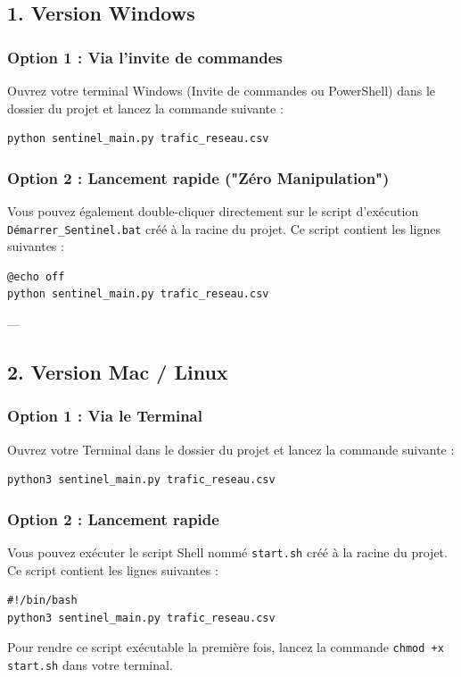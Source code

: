 \documentclass[a4paper, 12pt, twoside]{article}
\begin{document}
\subsection*{1. Version Windows}

\subsubsection*{Option 1 : Via l'invite de commandes}
Ouvrez votre terminal Windows (Invite de commandes ou PowerShell) dans le dossier du projet et lancez la commande suivante :
\begin{verbatim}
python sentinel_main.py trafic_reseau.csv
\end{verbatim}

\subsubsection*{Option 2 : Lancement rapide ("Zéro Manipulation")}
Vous pouvez également double-cliquer directement sur le script d'exécution \texttt{Démarrer\_Sentinel.bat} créé à la racine du projet. Ce script contient les lignes suivantes :
\begin{verbatim}
@echo off
python sentinel_main.py trafic_reseau.csv
\end{verbatim}

---

\subsection*{2. Version Mac / Linux}

\subsubsection*{Option 1 : Via le Terminal}
Ouvrez votre Terminal dans le dossier du projet et lancez la commande suivante :
\begin{verbatim}
python3 sentinel_main.py trafic_reseau.csv
\end{verbatim}

\subsubsection*{Option 2 : Lancement rapide}
Vous pouvez exécuter le script Shell nommé \texttt{start.sh} créé à la racine du projet. Ce script contient les lignes suivantes :
\begin{verbatim}
#!/bin/bash
python3 sentinel_main.py trafic_reseau.csv
\end{verbatim}
Pour rendre ce script exécutable la première fois, lancez la commande \texttt{chmod +x start.sh} dans votre terminal.
\end{document}
